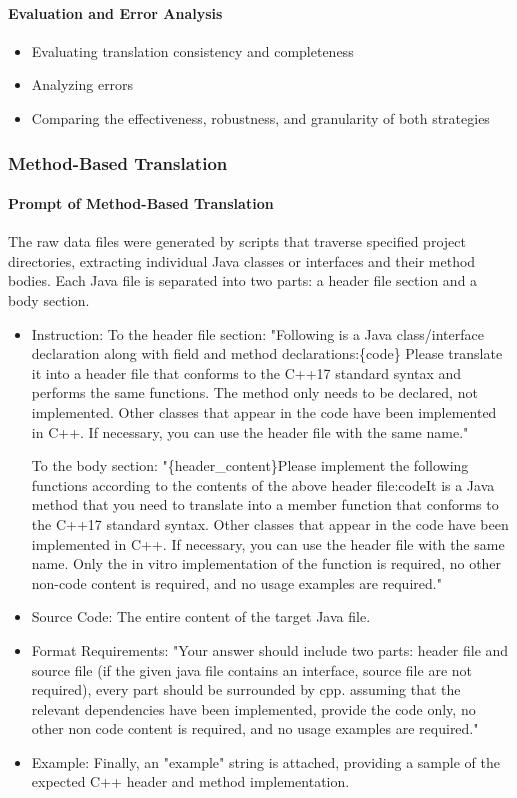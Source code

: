 \paragraph{Evaluation and Error Analysis}
\begin{itemize}
    \item Evaluating translation consistency and completeness
    \item Analyzing errors
    \item Comparing the effectiveness, robustness, and granularity of both strategies
\end{itemize}

\subsubsection{Method-Based Translation}

\paragraph{Prompt of Method-Based Translation}
The raw data files were generated by scripts that traverse specified project directories, extracting individual Java classes or interfaces and their method bodies. Each Java file is separated into two parts: a header file section and a body section.

\begin{itemize}
    \item Instruction: To the header file section: "Following is a Java class/interface declaration along with field and method declarations:\{code\} Please translate it into a header file that conforms to the C++17 standard syntax and performs the same functions. The method only needs to be declared, not implemented. Other classes that appear in the code have been implemented in C++. If necessary, you can use the header file with the same name."
    
    To the body section: "\{header\_content\}Please implement the following functions according to the contents of the above header file:{code}It is a Java method that you need to translate into a member function that conforms to the C++17 standard syntax. Other classes that appear in the code have been implemented in C++. If necessary, you can use the header file with the same name. Only the in vitro implementation of the function is required, no other non-code content is required, and no usage examples are required."
    \item Source Code: The entire content of the target Java file.
    \item Format Requirements: "Your answer should include two parts: header file and source file (if the given java file contains an interface, source file are not required), every part should be surrounded by cpp. assuming that the relevant dependencies have been implemented, provide the code only, no other non code content is required, and no usage examples are required."
    \item Example: Finally, an "example" string is attached, providing a sample of the expected C++ header and method implementation.
\end{itemize}

